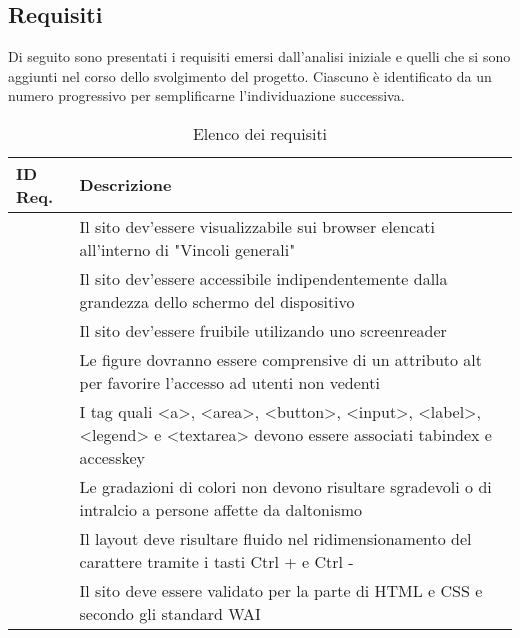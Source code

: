 {	\subsection{Requisiti}{
		Di seguito sono presentati i requisiti emersi dall'analisi iniziale e quelli che si sono aggiunti nel corso dello svolgimento del progetto. Ciascuno è identificato da un numero progressivo per semplificarne l'individuazione successiva.\\
		\newcommand\rownumber{\stepcounter{magicrownumbers}\arabic{magicrownumbers}}
		\begin{table}[h]
			\centering
			\begin{tabular}{|p{}|p{}|}
				\hline
			 	\textbf{ID Req.} & \textbf{Descrizione}\\
				\hline
				\centering \rownumber	&	Il sito dev'essere visualizzabile sui browser elencati all'interno di "Vincoli generali"\\
				\hline
				\centering \rownumber	&	Il sito dev'essere accessibile indipendentemente dalla grandezza dello schermo del dispositivo\\
				\hline
				\centering \rownumber	&	Il sito dev'essere fruibile utilizando uno screenreader\\
				\hline
				\centering \rownumber	&	Le figure dovranno essere comprensive di un attributo alt per favorire l'accesso ad	utenti non vedenti\\
				\hline
				\centering \rownumber	&	I tag quali <a>, <area>, <button>, <input>, <label>, <legend> e <textarea> devono essere associati tabindex e accesskey\\
				\hline
				\centering \rownumber	&	Le gradazioni di colori non devono risultare sgradevoli o di intralcio a persone affette da daltonismo\\
				\hline
				\centering \rownumber	&	Il layout deve risultare fluido nel ridimensionamento del carattere tramite i tasti Ctrl + e Ctrl -\\
				\hline
				\centering \rownumber	&	Il sito deve essere validato per la parte di HTML e CSS e secondo gli standard WAI\\
				\hline
			\end{tabular}
			\label{tab:requisiti}
			\caption{Elenco dei requisiti}
		\end{table}
	}
}
